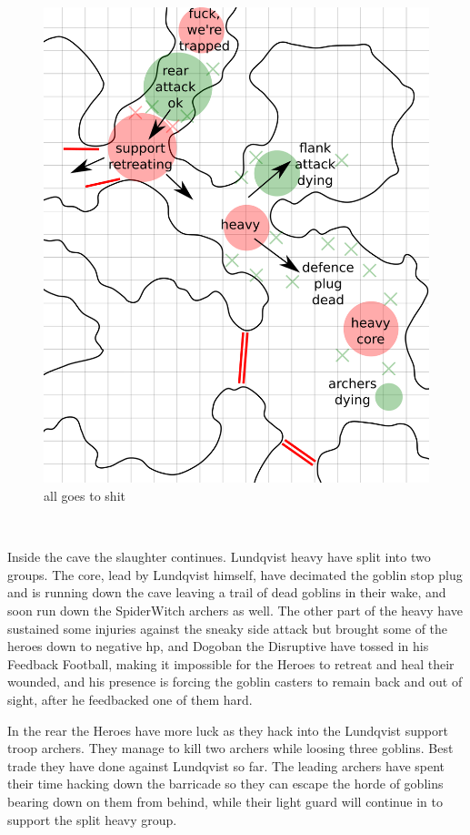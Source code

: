 \begin{figure}    %
\centering
\includegraphics[width=0.9\linewidth]{./fig/hool2lundqvistresult2-zoom.png}
\caption*{all goes to shit}
\end{figure}

\

Inside the cave the slaughter continues. Lundqvist heavy have split into two groups. The core, lead by Lundqvist himself, have decimated the goblin stop plug and is running down the cave leaving a trail of dead goblins in their wake, and soon run down the SpiderWitch archers as well. The other part of the heavy have sustained some injuries against the sneaky side attack but brought some of the heroes down to negative hp, and Dogoban the Disruptive have tossed in his Feedback Football, making it impossible for the Heroes to retreat and heal their wounded, and his presence is forcing the goblin casters to remain back and out of sight, after he feedbacked one of them hard.

In the rear the Heroes have more luck as they hack into the Lundqvist support troop archers. They manage to kill two archers while loosing three goblins. Best trade they have done against Lundqvist so far. The leading archers have spent their time hacking down the barricade so they can escape the horde of goblins bearing down on them from behind, while their light guard will continue in to support the split heavy group.

